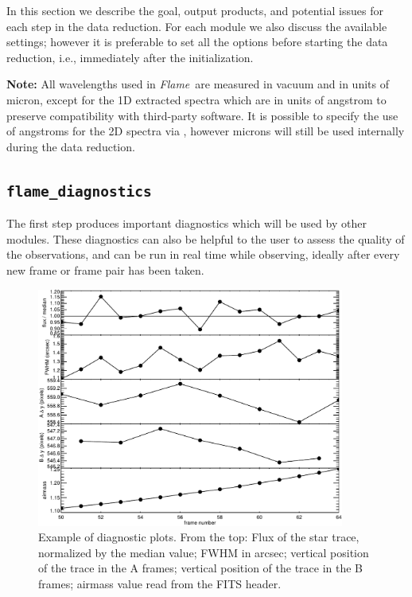 \documentclass[a4paper]{article}
\newcommand{\flame}{\emph{Flame}}
\begin{document}
\begin{sloppypar}
In this section we describe the goal, output products, and potential issues for each step in the data reduction. For each module we also discuss the available settings; however it is preferable to set all the options before starting the data reduction, i.e., immediately after the initialization.

\medskip
\noindent
\textbf{Note:} All wavelengths used in \flame\ are measured in vacuum and in units of micron, except for the 1D extracted spectra which are in units of angstrom to preserve compatibility with third-party software. It is possible to specify the use of angstroms for the 2D spectra via , however microns will still be used internally during the data reduction.




\subsection{\texttt{flame\_diagnostics}}
\label{sec:diagnostics}

The first step produces important diagnostics which will be used by other modules. These diagnostics can also be helpful to the user to assess the quality of the observations, and can be run in real time while observing, ideally after every new frame or frame pair has been taken.

\begin{figure}[htbp]
\centering
\includegraphics[width=0.9\textwidth]{diagnostics}
\caption{Example of diagnostic plots. From the top: Flux of the star trace, normalized by the median value; FWHM in arcsec; vertical position of the trace in the A frames; vertical position of the trace in the B frames; airmass value read from the FITS header.}
\label{fig:diagnostics}
\end{figure}


\end{sloppypar}
\end{document}

